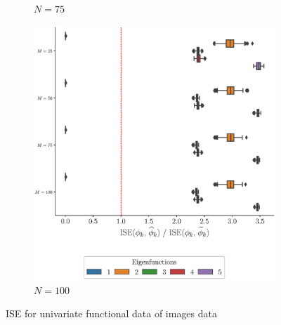 \begin{results}
\begin{figure}
\begin{subfigure}[b]{0.49\textwidth}
         \caption{$N = 75$}
         \label{fig:ise_mfd_2d_75}
     \end{subfigure}
     \begin{subfigure}[b]{0.49\textwidth}
         \centering
         \includegraphics[width=\textwidth]{figures/scenario_2/ise_N100.eps}
         \caption{$N = 100$}
         \label{fig:ise_mfd_2d_100}
    \end{subfigure}
    \caption{ISE for univariate functional data of images data}
    \label{fig:ise_mfd_2d}
\end{figure}

\end{results}

